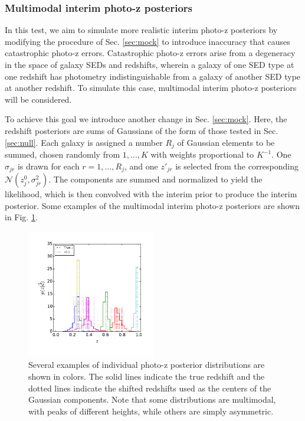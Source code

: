 \documentclass[preprint]{aastex}
\begin{document}
\clearpage
\subsubsection{Multimodal interim photo-z posteriors}
\label{sec:multi}

In this test, we aim to simulate more realistic interim photo-z posteriors by 
modifying the procedure of Sec. \ref{sec:mock} to introduce inaccuracy that 
causes catastrophic photo-z errors.  Catastrophic photo-z errors arise from a 
degeneracy in the space of galaxy SEDs and redshifts, wherein a galaxy of one 
SED type at one redshift has photometry indistinguishable from a galaxy of 
another SED type at another redshift.  To simulate this case, multimodal 
interim photo-z posteriors will be considered.

To achieve this goal we introduce another change in Sec. \ref{sec:mock}.  Here, 
the redshift posteriors are sums of Gaussians of the form of those tested in 
Sec. \ref{sec:null}.  Each galaxy is assigned a number $R_{j}$ of Gaussian 
elements to be summed, chosen randomly from $1,\dots,K$ with weights 
proportional to $K^{-1}$.  One $\sigma_{jr}$ is drawn for each 
$r=1,\dots,R_{j}$, and one $z'_{jr}$ is selected from the corresponding 
$\mathcal{N}(z^{0}_{j},\sigma^{2}_{jr})$.  The components are summed and 
normalized to yield the likelihood, which is then convolved with the interim 
prior to produce the interim posterior.  Some examples of the multimodal 
interim photo-z posteriors are shown in Fig. \ref{fig:multipzs}.  

\begin{figure}
\includegraphics[width=0.5\textwidth]{figs/mult/samplepzs.pdf}
\caption{Several examples of individual photo-z posterior distributions are 
shown in colors.  The solid lines indicate the true redshift and the dotted 
lines indicate the shifted redshifts used as the centers of the Gaussian 
components.  Note that some distributions are multimodal, with peaks of 
different heights, while others are simply asymmetric.}
\label{fig:multipzs}
\end{figure}
\end{document}
